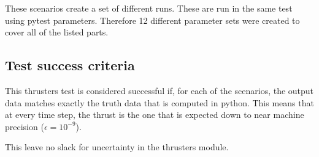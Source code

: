 These scenarios create a set of different runs. These are run in the same test using pytest parameters. Therefore 12 different parameter sets were created to cover all of the listed parts.

\subsection{Test success criteria}

This thrusters test is considered successful if, for each of the scenarios, the output data matches exactly the truth data that is computed in python. This means that at every time step, the thrust is the one that is expected down to near machine precision ($\epsilon = 10^{-9}$). 

This leave no slack for uncertainty in the thrusters module.
